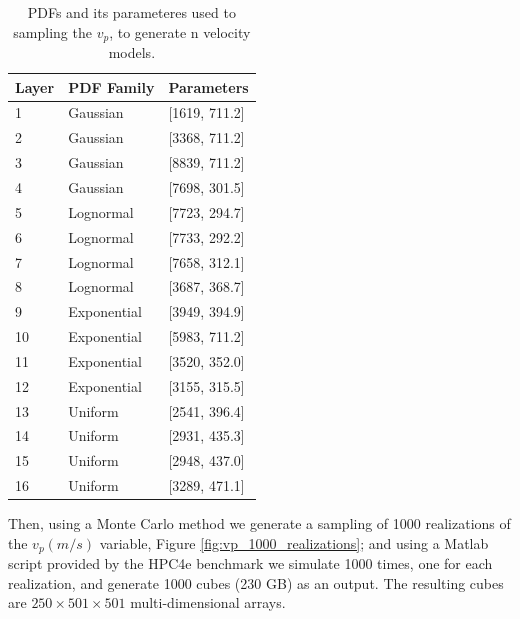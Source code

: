 \begin{table}
\begin{center}
    \begin{tabular}{|l|l|l|}
    \hline
    \textbf{Layer} & \textbf{PDF Family}                & \textbf{Parameters}           \\ \hline
    1     & Gaussian & [1619, 711.2] \\ \hline
    2     & Gaussian & [3368, 711.2]               \\ \hline
    3     & Gaussian & [8839, 711.2]               \\ \hline
    4     & Gaussian & [7698, 301.5]               \\ \hline
    5     & Lognormal   & [7723, 294.7]               \\ \hline
    6     & Lognormal   & [7733, 292.2]               \\ \hline
    7     & Lognormal   & [7658, 312.1]               \\ \hline
    8     & Lognormal   & [3687, 368.7]               \\ \hline
    9     & Exponential & [3949, 394.9]             \\ \hline
    10   & Exponential & [5983, 711.2]               \\ \hline
    11   & Exponential & [3520, 352.0]              \\ \hline
    12   & Exponential & [3155, 315.5]              \\ \hline
    13   & Uniform     & [2541, 396.4]              \\ \hline
    14   & Uniform     & [2931, 435.3]              \\ \hline
    15   & Uniform     & [2948, 437.0]             \\ \hline
    16   & Uniform     & [3289, 471.1]              \\ \hline
    \end{tabular}
    \caption {PDFs and its parameteres used to sampling the $v_{p}$, to generate n velocity models.}
    \label{tab:PDFsOfVp}
    \end{center}
\end{table}

Then, using a Monte Carlo method we generate a sampling of 1000 realizations of the $v_{p}(m/s)$ variable, Figure \ref{fig:vp_1000_realizations}; and using a Matlab script provided by the HPC4e benchmark we simulate 1000 times, one for each  realization, and generate 1000 cubes (230 GB) as an output. The resulting cubes are $250\times501\times501$  multi-dimensional arrays. 

